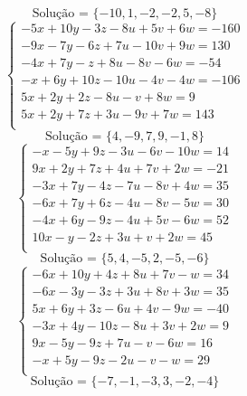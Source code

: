 \documentclass[12pt,oneside,a4paper]{article}
\begin{document}
\begin{equation*}
\text{Solução = }\{-10,1,-2,-2,5,-8\}
\end{equation*}
\vspace{\baselineskip}
\begin{equation*}
\begin{cases}
-5x+10y-3z-8u+5v+6w=-160 \\
-9x-7y-6z+7u-10v+9w=130 \\
-4x+7y-z+8u-8v-6w=-54 \\
-x+6y+10z-10u-4v-4w=-106 \\
5x+2y+2z-8u-v+8w=9 \\
5x+2y+7z+3u-9v+7w=143 \\
\end{cases}
\end{equation*}
\begin{equation*}
\text{Solução = }\{4,-9,7,9,-1,8\}
\end{equation*}
\vspace{\baselineskip}
\begin{equation*}
\begin{cases}
-x-5y+9z-3u-6v-10w=14 \\
9x+2y+7z+4u+7v+2w=-21 \\
-3x+7y-4z-7u-8v+4w=35 \\
-6x+7y+6z-4u-8v-5w=30 \\
-4x+6y-9z-4u+5v-6w=52 \\
10x-y-2z+3u+v+2w=45 \\
\end{cases}
\end{equation*}
\begin{equation*}
\text{Solução = }\{5,4,-5,2,-5,-6\}
\end{equation*}
\vspace{\baselineskip}
\begin{equation*}
\begin{cases}
-6x+10y+4z+8u+7v-w=34 \\
-6x-3y-3z+3u+8v+3w=35 \\
5x+6y+3z-6u+4v-9w=-40 \\
-3x+4y-10z-8u+3v+2w=9 \\
9x-5y-9z+7u-v-6w=16 \\
-x+5y-9z-2u-v-w=29 \\
\end{cases}
\end{equation*}
\begin{equation*}
\text{Solução = }\{-7,-1,-3,3,-2,-4\}
\end{equation*}
\end{document}
